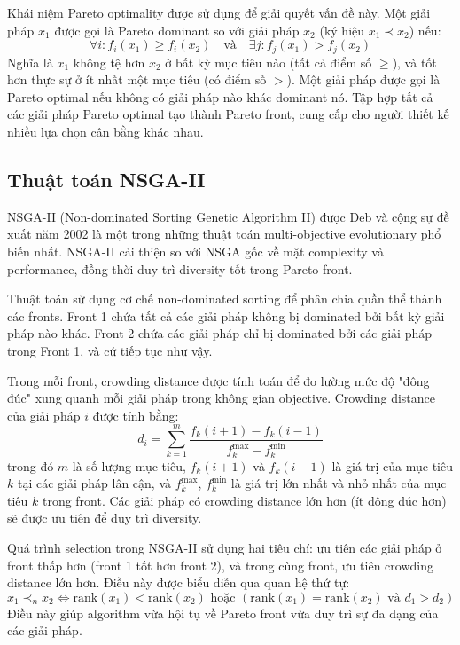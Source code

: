 Khái niệm Pareto optimality được sử dụng để giải quyết vấn đề này. Một giải pháp $x_1$ được gọi là Pareto dominant so với giải pháp $x_2$ (ký hiệu $x_1 \prec x_2$) nếu:
\begin{equation}
\forall i: f_i(x_1) \geq f_i(x_2) \quad \text{và} \quad \exists j: f_j(x_1) > f_j(x_2)
\end{equation}
Nghĩa là $x_1$ không tệ hơn $x_2$ ở bất kỳ mục tiêu nào (tất cả điểm số $\geq$), và tốt hơn thực sự ở ít nhất một mục tiêu (có điểm số $>$). Một giải pháp được gọi là Pareto optimal nếu không có giải pháp nào khác dominant nó. Tập hợp tất cả các giải pháp Pareto optimal tạo thành Pareto front, cung cấp cho người thiết kế nhiều lựa chọn cân bằng khác nhau.

\subsection{Thuật toán NSGA-II}

NSGA-II (Non-dominated Sorting Genetic Algorithm II) được Deb và cộng sự đề xuất năm 2002 \cite{deb2002fast} là một trong những thuật toán multi-objective evolutionary phổ biến nhất. NSGA-II cải thiện so với NSGA gốc về mặt complexity và performance, đồng thời duy trì diversity tốt trong Pareto front.

Thuật toán sử dụng cơ chế non-dominated sorting để phân chia quần thể thành các fronts. Front 1 chứa tất cả các giải pháp không bị dominated bởi bất kỳ giải pháp nào khác. Front 2 chứa các giải pháp chỉ bị dominated bởi các giải pháp trong Front 1, và cứ tiếp tục như vậy. 

Trong mỗi front, crowding distance được tính toán để đo lường mức độ "đông đúc" xung quanh mỗi giải pháp trong không gian objective. Crowding distance của giải pháp $i$ được tính bằng:
\begin{equation}
d_i = \sum_{k=1}^{m} \frac{f_k(i+1) - f_k(i-1)}{f_k^{\max} - f_k^{\min}}
\end{equation}
trong đó $m$ là số lượng mục tiêu, $f_k(i+1)$ và $f_k(i-1)$ là giá trị của mục tiêu $k$ tại các giải pháp lân cận, và $f_k^{\max}$, $f_k^{\min}$ là giá trị lớn nhất và nhỏ nhất của mục tiêu $k$ trong front. Các giải pháp có crowding distance lớn hơn (ít đông đúc hơn) sẽ được ưu tiên để duy trì diversity.

Quá trình selection trong NSGA-II sử dụng hai tiêu chí: ưu tiên các giải pháp ở front thấp hơn (front 1 tốt hơn front 2), và trong cùng front, ưu tiên crowding distance lớn hơn. Điều này được biểu diễn qua quan hệ thứ tự:
\begin{equation}
x_1 \prec_n x_2 \iff \text{rank}(x_1) < \text{rank}(x_2) \text{ hoặc } (\text{rank}(x_1) = \text{rank}(x_2) \text{ và } d_1 > d_2)
\end{equation}
Điều này giúp algorithm vừa hội tụ về Pareto front vừa duy trì sự đa dạng của các giải pháp.

